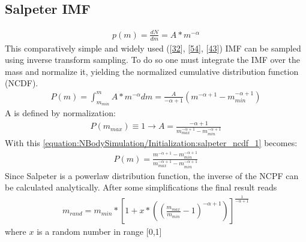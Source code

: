 \documentclass[letterpaper,10pt,english]{sphinxmanual}
\begin{document}
\subsection{Salpeter IMF}
\label{\detokenize{NBodySimulation/Initialization:salpeter-imf}}\begin{equation}\label{equation:NBodySimulation/Initialization:salpeter}
\begin{split}p(m)=\frac{dN}{dm}=A*m^{-\alpha }\end{split}
\end{equation}
\sphinxAtStartPar
This comparatively simple and widely used ({[}\hyperlink{cite.NBodySimulation/Appendix:id46}{32}{]}, {[}\hyperlink{cite.NBodySimulation/Appendix:id47}{54}{]}, {[}\hyperlink{cite.NBodySimulation/Appendix:id48}{43}{]}) IMF can be sampled using inverse transform sampling.
To do so one must integrate the IMF over the mass and normalize it, yielding the normalized cumulative distribution function (NCDF).
\begin{equation}\label{equation:NBodySimulation/Initialization:salpeter_ncdf_1}
\begin{split}P(m)=\int_{m_{min}}^{m}A*m^{-\alpha } dm = \frac{A}{-\alpha +1}\left ( m^{-\alpha +1} -m_{min}^{-\alpha +1}\right )\end{split}
\end{equation}
\sphinxAtStartPar
A is defined by normalization:
\begin{equation*}
\begin{split}P({m_{max}})\equiv 1\rightarrow A=\frac{-\alpha +1}{m_{max}^{-\alpha +1} -m_{min}^{-\alpha +1} }\end{split}
\end{equation*}
\sphinxAtStartPar
With this \eqref{equation:NBodySimulation/Initialization:salpeter_ncdf_1} becomes:
\begin{equation*}
\begin{split}P(m)=\frac{m^{-\alpha +1} -m_{min}^{-\alpha +1}}{m_{max}^{-\alpha +1} -m_{min}^{-\alpha +1}}\end{split}
\end{equation*}
\sphinxAtStartPar
Since Salpeter is a power\sphinxhyphen{}law distribution function, the inverse of the NCPF can be calculated analytically. After some simplifications the final result reads
\begin{equation*}
\begin{split}m_{rand} = m_{min}*\left [ 1+x*\left ( \left ( \frac{m_{max}}{m_{min}} -1\right )^{-\alpha +1} \right ) \right ]^{\frac{1}{-\alpha +1}}\end{split}
\end{equation*}
\sphinxAtStartPar
where \(x\) is a random number in range {[}0,1{]}
\end{document}
